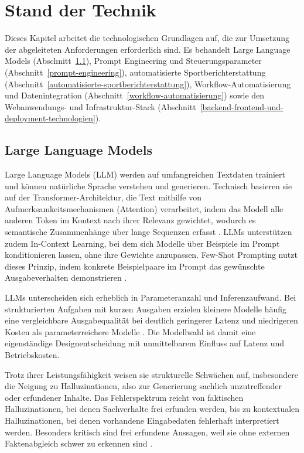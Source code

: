 \chapter{Stand der Technik}\label{stand-der-technik}

Dieses Kapitel arbeitet die technologischen Grundlagen auf, die zur Umsetzung der abgeleiteten Anforderungen erforderlich sind. Es behandelt Large Language Models (Abschnitt~\ref{large-language-models}), Prompt Engineering und Steuerungsparameter (Abschnitt~\ref{prompt-engineering}), automatisierte Sportberichterstattung (Abschnitt~\ref{automatisierte-sportberichterstattung}), Workflow-Automatisierung und Datenintegration (Abschnitt~\ref{workflow-automatisierung}) sowie den Webanwendungs- und Infrastruktur-Stack (Abschnitt~\ref{backend-frontend-und-deployment-technologien}).

\section{Large Language Models}\label{large-language-models}

Large Language Models (LLM) werden auf umfangreichen Textdaten trainiert und können natürliche Sprache verstehen und generieren. Technisch basieren sie auf der Transformer-Architektur, die Text mithilfe von Aufmerksamkeitsmechanismen (Attention) verarbeitet, indem das Modell alle anderen Token im Kontext nach ihrer Relevanz gewichtet, wodurch es semantische Zusammenhänge über lange Sequenzen erfasst \cite{vaswani2017}. LLMs unterstützen zudem In-Context Learning, bei dem sich Modelle über Beispiele im Prompt konditionieren lassen, ohne ihre Gewichte anzupassen. Few-Shot Prompting nutzt dieses Prinzip, indem konkrete Beispielpaare im Prompt das gewünschte Ausgabeverhalten demonstrieren \cite{brown2020}.

LLMs unterscheiden sich erheblich in Parameteranzahl und Inferenzaufwand. Bei strukturierten Aufgaben mit kurzen Ausgaben erzielen kleinere Modelle häufig eine vergleichbare Ausgabequalität bei deutlich geringerer Latenz und niedrigeren Kosten als parameterreichere Modelle \cite{brown2020, openai2023}. Die Modellwahl ist damit eine eigenständige Designentscheidung mit unmittelbarem Einfluss auf Latenz und Betriebskosten.

Trotz ihrer Leistungsfähigkeit weisen sie strukturelle Schwächen auf, insbesondere die Neigung zu Halluzinationen, also zur Generierung sachlich unzutreffender oder erfundener Inhalte. Das Fehlerspektrum reicht von faktischen Halluzinationen, bei denen Sachverhalte frei erfunden werden, bis zu kontextualen Halluzinationen, bei denen vorhandene Eingabedaten fehlerhaft interpretiert werden. Besonders kritisch sind frei erfundene Aussagen, weil sie ohne externen Faktenabgleich schwer zu erkennen sind \cite{openai2023}.


